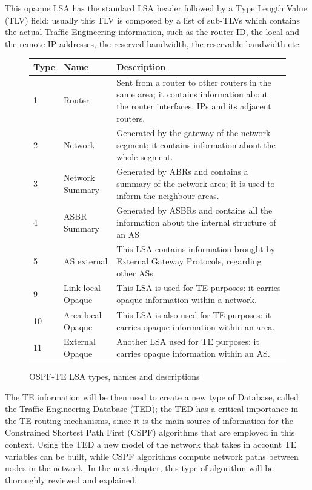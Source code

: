 \documentclass[10pt,a4paper]{report}
\begin{document}
\newpage

This opaque LSA has the standard LSA header followed by a Type Length
Value (TLV) field: usually this TLV is composed by a list of sub-TLVs
which contains the actual Traffic Engineering information, such as the
router ID, the local and the remote IP addresses, the reserved
bandwidth, the reservable bandwidth etc.

\begin{figure}[!tbp]
  \begin{center}
    \begin{tabular}{|l|l|p{}|}
      \hline
      Type& Name & Description \\ \hline
      1 &  Router & Sent from a router to other routers in the same
      area; it contains information about the router interfaces, IPs
      and its adjacent routers. \\
      2 & Network & Generated by the gateway of the network segment;
      it contains information about the whole segment. \\
      3 & Network Summary & Generated by ABRs and contains a summary
      of the network area; it is used to inform the neighbour areas. \\
      4 & ASBR Summary &  Generated by ASBRs and contains all the
      information about the internal structure of an AS \\
      5 & AS external &  This LSA contains information brought by
      External Gateway Protocols, regarding other ASs. \\
      9 & Link-local Opaque & This LSA is used for TE purposes: it
      carries opaque information within a network. \\
      10 & Area-local Opaque & This LSA is also used for TE purposes:
      it carries opaque information within an area. \\
      11 & External Opaque & Another LSA used for TE purposes: it
      carries opaque information within an AS. \\
      \hline
    \end{tabular}
    \caption[OSPF-TE LSA Types]{OSPF-TE LSA types, names and
      descriptions}
    \label{fig:ospf_lsa}
  \end{center}
\end{figure}

The TE information will be then used to create a new type of Database,
called the Traffic Engineering Database (TED); the TED has a critical
importance in the TE routing mechanisms, since it is the main source
of information for the Constrained Shortest Path First (CSPF)
algorithms that are employed in this context. Using the TED a new
model of the network that takes in account TE variables can be built,
while CSPF algorithms compute network paths between nodes in the
network. In the next chapter, this type of algorithm will be
thoroughly reviewed and explained.
\end{document}

